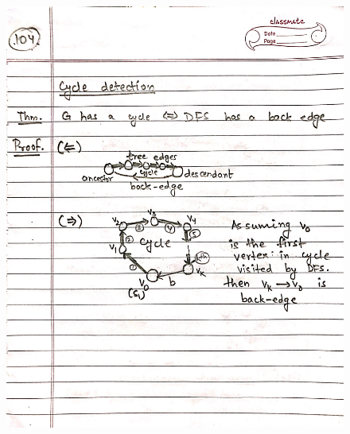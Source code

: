 \begin{figure}[H]
    \centering
    \includegraphics[width=16cm, height=21cm]{"./MIT-6.006/MIT-6006-104"}
\end{figure}
\newpage
